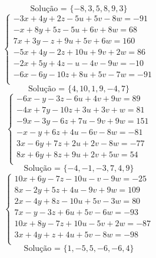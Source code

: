 \documentclass[12pt,oneside,a4paper]{article}
\begin{document}
\begin{equation*}
\text{Solução = }\{-8,3,5,8,9,3\}
\end{equation*}
\vspace{\baselineskip}
\begin{equation*}
\begin{cases}
-3x+4y+2z-5u+5v-8w=-91 \\
-x+8y+5z-5u+6v+8w=68 \\
7x+3y-z+9u+5v+6w=160 \\
-5x+4y-2z+10u+9v+2w=86 \\
-2x+5y+4z-u-4v-9w=-10 \\
-6x-6y-10z+8u+5v-7w=-91 \\
\end{cases}
\end{equation*}
\begin{equation*}
\text{Solução = }\{4,10,1,9,-4,7\}
\end{equation*}
\vspace{\baselineskip}
\begin{equation*}
\begin{cases}
-6x-y-3z-6u+4v+9w=89 \\
-4x+7y-10z+3u+3v+w=81 \\
-9x-3y-6z+7u-9v+9w=151 \\
-x-y+6z+4u-6v-8w=-81 \\
3x-6y+7z+2u+2v-8w=-77 \\
8x+6y+8z+9u+2v+5w=54 \\
\end{cases}
\end{equation*}
\begin{equation*}
\text{Solução = }\{-4,-1,-3,7,4,9\}
\end{equation*}
\vspace{\baselineskip}
\begin{equation*}
\begin{cases}
10x+6y-7z-10u-v-9w=-25 \\
8x-2y+5z+4u-9v+9w=109 \\
2x-4y+8z-10u+5v-3w=80 \\
7x-y-3z+6u+5v-6w=-93 \\
10x+8y-7z+10u-5v+2w=-87 \\
3x+4y+z+4u+5v-8w=-98 \\
\end{cases}
\end{equation*}
\begin{equation*}
\text{Solução = }\{1,-5,5,-6,-6,4\}
\end{equation*}
\end{document}
